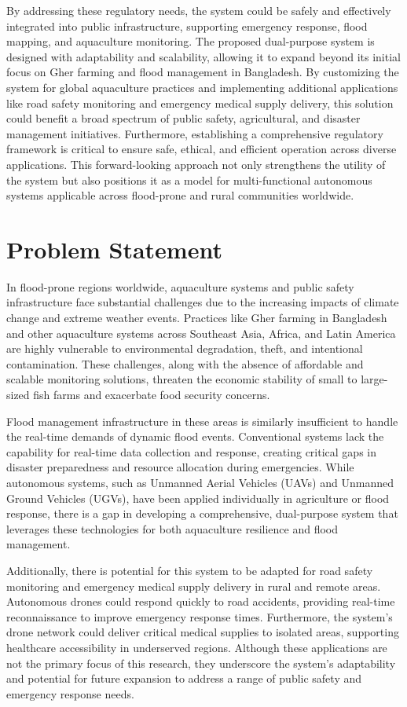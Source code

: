 \documentclass[conference]{IEEEtran}
\begin{document}
By addressing these regulatory needs, the system could be safely and effectively integrated into public infrastructure, supporting emergency response, flood mapping, and aquaculture monitoring.
The proposed dual-purpose system is designed with adaptability and scalability, allowing it to expand beyond its initial focus on Gher farming and flood management in Bangladesh. By customizing the system for global aquaculture practices and implementing additional applications like road safety monitoring and emergency medical supply delivery, this solution could benefit a broad spectrum of public safety, agricultural, and disaster management initiatives. Furthermore, establishing a comprehensive regulatory framework is critical to ensure safe, ethical, and efficient operation across diverse applications. This forward-looking approach not only strengthens the utility of the system but also positions it as a model for multi-functional autonomous systems applicable across flood-prone and rural communities worldwide.


\section{\textbf{Problem Statement}}
In flood-prone regions worldwide, aquaculture systems and public safety infrastructure face substantial challenges due to the increasing impacts of climate change and extreme weather events. Practices like Gher farming in Bangladesh and other aquaculture systems across Southeast Asia, Africa, and Latin America are highly vulnerable to environmental degradation, theft, and intentional contamination. These challenges, along with the absence of affordable and scalable monitoring solutions, threaten the economic stability of small to large-sized fish farms and exacerbate food security concerns.

Flood management infrastructure in these areas is similarly insufficient to handle the real-time demands of dynamic flood events. Conventional systems lack the capability for real-time data collection and response, creating critical gaps in disaster preparedness and resource allocation during emergencies. While autonomous systems, such as Unmanned Aerial Vehicles (UAVs) and Unmanned Ground Vehicles (UGVs), have been applied individually in agriculture or flood response, there is a gap in developing a comprehensive, dual-purpose system that leverages these technologies for both aquaculture resilience and flood management.


Additionally, there is potential for this system to be adapted for road safety monitoring and emergency medical supply delivery in rural and remote areas. Autonomous drones could respond quickly to road accidents, providing real-time reconnaissance to improve emergency response times. Furthermore, the system’s drone network could deliver critical medical supplies to isolated areas, supporting healthcare accessibility in underserved regions. Although these applications are not the primary focus of this research, they underscore the system’s adaptability and potential for future expansion to address a range of public safety and emergency response needs.
\end{document}
